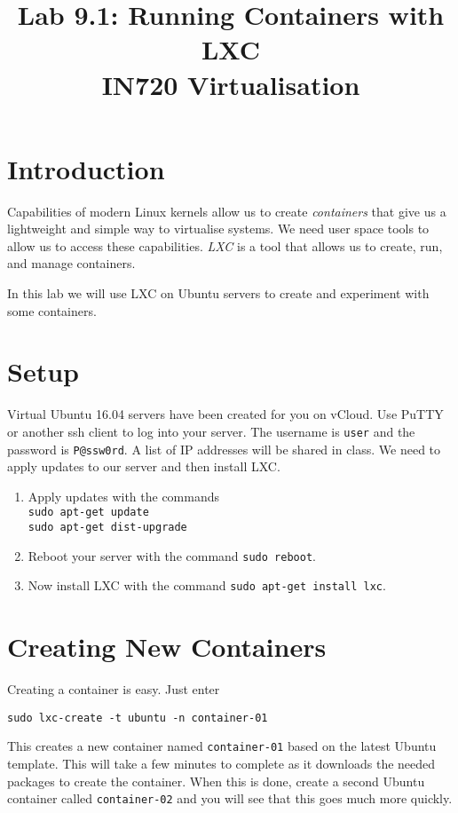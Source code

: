 \documentclass{article}
\begin{document}
\title{Lab 9.1: Running Containers with LXC\\ IN720 Virtualisation}
\date{}
\maketitle

\section*{Introduction}
Capabilities of modern Linux kernels allow us to create \emph{containers} that give us a lightweight and simple way to virtualise systems. We need user space tools to allow us to access these capabilities.  \emph{LXC} is a tool that allows us to create, run, and manage containers.

In this lab we will use LXC on Ubuntu servers to create and experiment with some containers.

\section{Setup}
Virtual Ubuntu 16.04 servers have been created for you on vCloud.  Use PuTTY or another ssh client to log into your server. The username is \texttt{user} and the password is \texttt{P@ssw0rd}. A list of IP addresses will be shared in class. We need to apply updates to our server and then install LXC.

\begin{enumerate}
	\item Apply updates with the commands \\
	\texttt{sudo apt-get update} \\
	\texttt{sudo apt-get dist-upgrade}
	\item Reboot your server with the command \texttt{sudo reboot}.
	\item Now install LXC with the command \texttt{sudo apt-get install lxc}.
\end{enumerate} 

\section{Creating New Containers}
Creating a container is easy.  Just enter
\begin{verbatim}
sudo lxc-create -t ubuntu -n container-01
\end{verbatim}

This creates a new container named \texttt{container-01} based on the latest Ubuntu template.  This will take a few minutes to complete as it downloads the needed packages to create the container.  When this is done, create a second Ubuntu container called \texttt{container-02} and you will see that this goes much more quickly.
\end{document}
